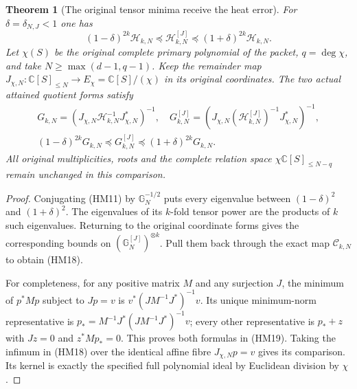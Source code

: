 \documentclass[11pt]{article}
\newcommand{\C}{\mathbb C}\newcommand{\R}{\mathbb R}
\newtheorem{theorem}{Theorem}\newtheorem{lemma}[theorem]{Lemma}
\begin{document}
\begin{theorem}[The original tensor minima receive the heat error]
For $\delta=\delta_{N,J}<1$ one has
\begin{equation}\tag{HM18}
 (1-\delta)^{2k}\mathcal H_{k,N}
 \preceq\mathcal H_{k,N}^{[J]}
 \preceq(1+\delta)^{2k}\mathcal H_{k,N}.
\end{equation}
Let $\chi(S)$ be the original complete primary polynomial of the packet,
$q=\deg\chi$, and take $N\ge\max(d-1,q-1)$. Keep the remainder map
$J_{\chi,N}:\C[S]_{\le N}\to E_\chi=\C[S]/(\chi)$ in its original
coordinates. The two actual attained quotient forms satisfy
\begin{equation}\tag{HM19}
 \begin{gathered}
 G_{k,N}=(J_{\chi,N}\mathcal H_{k,N}^{-1}J_{\chi,N}^*)^{-1},\quad
 G_{k,N}^{[J]}=(J_{\chi,N}(\mathcal H_{k,N}^{[J]})^{-1}
                                                   J_{\chi,N}^*)^{-1},\\
 (1-\delta)^{2k}G_{k,N}\preceq G_{k,N}^{[J]}
                                      \preceq(1+\delta)^{2k}G_{k,N}.
 \end{gathered}
\end{equation}
All original multiplicities, roots and the complete relation space
$\chi\C[S]_{\le N-q}$ remain unchanged in this comparison.
\end{theorem}
\begin{proof}
Conjugating (HM11) by $\mathbb G_N^{-1/2}$ puts every eigenvalue
between $(1-\delta)^2$ and $(1+\delta)^2$. The eigenvalues of its
$k$-fold tensor power are the products of $k$ such eigenvalues. Returning
to the original coordinate forms gives the corresponding bounds on
$(\mathbb G_N^{[J]})^{\otimes k}$. Pull them back through the exact
map $\mathcal C_{k,N}$ to obtain (HM18).

For completeness, for any positive matrix $M$ and any surjection $J$,
the minimum of $p^*Mp$ subject to $Jp=v$ is
$v^*(JM^{-1}J^*)^{-1}v$. Its unique minimum-norm representative is
$p_*=M^{-1}J^*(JM^{-1}J^*)^{-1}v$; every other representative is
$p_*+z$ with $Jz=0$ and $z^*Mp_*=0$. This proves both formulas in
(HM19). Taking the infimum in (HM18) over the identical affine fibre
$J_{\chi,N}p=v$ gives its comparison. Its kernel is exactly the
specified full polynomial ideal by Euclidean division by $\chi$.
\end{proof}
\end{document}
